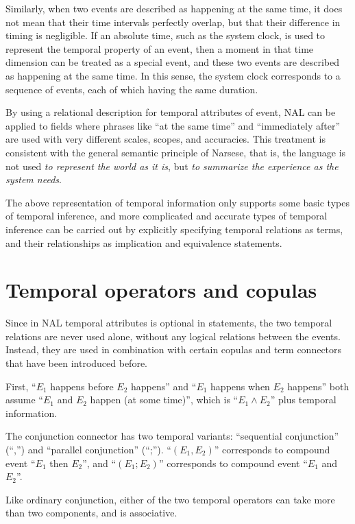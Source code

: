 Similarly, when two events are described as happening at the same time, it does not mean that their time intervals perfectly overlap, but that their difference in timing is negligible. If an absolute time, such as the system clock, is used to represent the temporal property of an event, then a moment in that time dimension can be treated as a special event, and these two events are described as happening at the same time. In this sense, the system clock corresponds to a sequence of events, each of which having the same duration.

By using a relational description for temporal attributes of event, NAL can be applied to fields where phrases like ``at the same time'' and ``immediately after'' are used with very different scales, scopes, and accuracies. This treatment is consistent with the general semantic principle of Narsese, that is, the language is not used \emph{to represent the world as it is}, but \emph{to summarize the experience as the system needs}.

The above representation of temporal information only supports some basic types of temporal inference, and more complicated and accurate types of temporal inference can be carried out by explicitly specifying temporal relations as terms, and their relationships as implication and equivalence statements.

\section{Temporal operators and copulas}

Since in NAL temporal attributes is optional in statements, the two temporal relations are never used alone, without any logical relations between the events. Instead, they are used in combination with certain copulas and term connectors that have been introduced before.

First, ``$E_1$ happens before $E_2$ happens'' and ``$E_1$ happens when $E_2$ happens'' both assume ``$E_1$ and $E_2$ happen (at some time)'', which is ``$E_1 \wedge E_2$'' plus temporal information.

\begin{defi}
The conjunction connector has two temporal variants: ``sequential conjunction'' (``,'') and ``parallel conjunction'' (``;'').  ``\((E_1, E_2)\)'' corresponds to compound event ``$E_1$ then $E_2$'', and ``\((E_1; E_2)\)'' corresponds to compound event ``$E_1$ and $E_2$''.
\end{defi}
Like ordinary conjunction, either of the two temporal operators can take more than two components, and is associative. 

